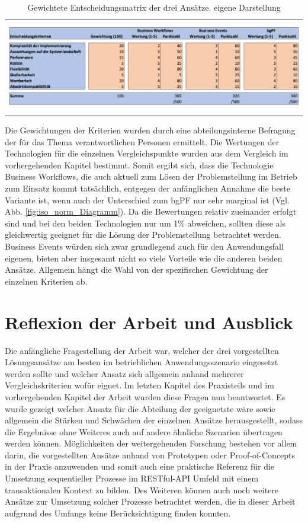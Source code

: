 \begin{table}[h]
    \centering
    \begin{tabular}{c}
        \includegraphics[height=4cm]{Bilder/Handlungsempfehlung_Entscheidungsmatrix.png}
    \end{tabular}
    \caption[Gewichtete Entscheidungsmatrix der drei Ansätze]{Gewichtete Entscheidungsmatrix der drei Ansätze. eigene Darstellung}
    \label{tab:iso_norm_Entscheidungsmatrix}
\end{table}


Die Gewichtungen der Kriterien wurden durch eine abteilungsinterne Befragung der für das Thema verantwortlichen Personen ermittelt. Die Wertungen der Technologien für die einzelnen Vergleichspunkte wurden aus dem Vergleich im vorhergehenden Kapitel bestimmt. Somit ergibt sich, dass die Technologie Business Workflows, die auch aktuell zum Lösen der Problemstellung im Betrieb zum Einsatz kommt tatsächlich, entgegen der anfänglichen Annahme die beste Variante ist, wenn auch der Unterschied zum bgPF nur sehr marginal ist (Vgl. Abb. \ref{fig:iso_norm_Diagramm}). Da die Bewertungen relativ zueinander erfolgt sind und bei den beiden Technologien nur um 1\% abweichen, sollten diese als gleichwertig geeignet für die Lösung der Problemstellung betrachtet werden. Business Events würden sich zwar grundlegend auch für den Anwendungsfall eigenen, bieten aber insgesamt nicht so viele Vorteile wie die anderen beiden Ansätze. Allgemein hängt die Wahl von der spezifischen Gewichtung der einzelnen Kriterien ab. 

\section{Reflexion der Arbeit und Ausblick}

Die anfängliche Fragestellung der Arbeit war, welcher der drei vorgestellten Lösungsansätze am besten im betrieblichen Anwendungsszenario eingesetzt werden sollte und welcher Ansatz sich allgemein anhand mehrerer Vergleichskriterien wofür eignet. Im letzten Kapitel des Praxisteils und im vorhergehenden Kapitel der Arbeit wurden diese Fragen nun beantwortet. Es wurde gezeigt welcher Ansatz für die Abteilung der geeignetste wäre sowie allgemein die Stärken und Schwächen der einzelnen Ansätze herausgestellt, sodass die Ergebnisse ohne Weiteres auch auf andere ähnliche Szenarien übertragen werden können. Möglichkeiten der weitergehenden Forschung bestehen vor allem darin, die vorgestellten Ansätze anhand von Prototypen oder Proof-of-Concepts in der Praxis anzuwenden und somit auch eine praktische Referenz für die Umsetzung sequentieller Prozesse im RESTful-API Umfeld mit einem transaktionalen Kontext zu bilden. Des Weiteren können auch noch weitere Ansätze zur Umsetzung solcher Prozesse betrachtet werden, die in dieser Arbeit aufgrund des Umfangs keine Berücksichtigung finden konnten.